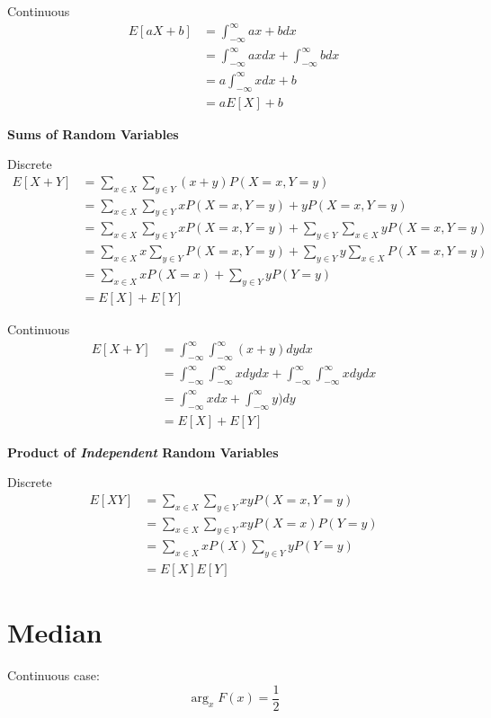 \documentclass{article}
\begin{document}
Continuous
\begin{align*}
  E[aX+b] &= \int_{-\infty}^{\infty} ax+b dx \\
  &= \int_{-\infty}^{\infty} axdx + \int_{-\infty}^{\infty} bdx \\
  &= a\int_{-\infty}^{\infty} xdx + b \\
  & = aE[X]+b
\end{align*}


\textbf{Sums of Random Variables}

Discrete
\begin{align*}
  E[X+Y] &= \sum_{x\in X} \sum_{y\in Y} (x+y) P(X=x,Y=y) \\
  &= \sum_{x\in X} \sum_{y\in Y} xP(X=x,Y=y) +yP(X=x,Y=y)\\
  &= \sum_{x\in X} \sum_{y\in Y} xP(X=x,Y=y) +\sum_{y\in Y} \sum_{x\in X} yP(X=x,Y=y)\\
  &= \sum_{x\in X} x \sum_{y\in Y} P(X=x,Y=y) +\sum_{y\in Y} y \sum_{x\in X} P(X=x,Y=y)\\
  &= \sum_{x\in X} x P(X=x) +\sum_{y\in Y} y P(Y=y)\\
  & = E[X]+E[Y]
\end{align*}

Continuous
\begin{align*}
  E[X+Y] &= \int_{-\infty}^{\infty} \int_{-\infty}^{\infty} (x+y) dydx \\
  &= \int_{-\infty}^{\infty} \int_{-\infty}^{\infty} x dydx + \int_{-\infty}^{\infty} \int_{-\infty}^{\infty} x dydx \\
  &= \int_{-\infty}^{\infty} x dx +\int_{-\infty}^{\infty} y) dy \\
  & = E[X]+E[Y]
\end{align*}

\textbf{Product of \textit{Independent} Random Variables}

Discrete
\begin{align*}
  E[XY] &= \sum_{x\in X}\sum_{y\in Y} xyP(X=x,Y=y)\\
  &= \sum_{x\in X}\sum_{y\in Y} xyP(X=x)P(Y=y)\\
  &= \sum_{x\in X}xP(X)\sum_{y\in Y} yP(Y=y)\\
  &= E[X]E[Y]
\end{align*}

\section{Median}

Continuous case:
\begin{equation*}
  \arg_x F(x) = \frac{1}{2}
\end{equation*}
\end{document}
